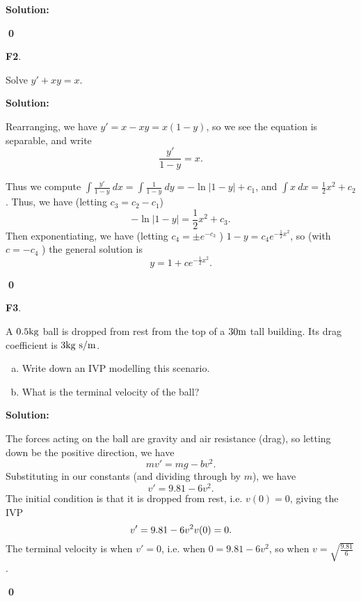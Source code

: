 \documentclass{article}
\newenvironment{problem}[1]
{
  \begin{flushleft}
  \textbf{#1}.
  \ignorespaces
}
{
  \end{flushleft}
}
\newenvironment{solution}
{
  \ignorespaces
  \textbf{Solution:}
}
{
  \ignorespacesafterend
  \begin{flushright}
  {\bfseries \qed}
  \end{flushright}
}
\begin{document}
\begin{solution}

\begin{center}\end{center}
\end{solution}


\begin{problem}{F2}
Solve \(y'+xy=x\).
\end{problem}
\begin{solution}
Rearranging, we have \(y'=x-xy=x(1-y)\), so we see the equation is separable, and write
\[ \frac{y'}{1-y} = x .\]

Thus we compute \(\int \frac{y'}{1-y}\ dx = \int \frac{1}{1-y}\ dy = -\ln|1-y|+c_1\), and \(\int x\ dx = \frac{1}{2}x^2+c_2\).  
Thus, we have (letting \(c_3=c_2-c_1\)) \[-\ln|1-y|=\frac{1}{2}x^2+c_3.\]
Then exponentiating, we have (letting \(c_4=\pm e^{-c_3}\) ) \(1-y=c_4e^{-\frac{1}{2}x^2}\), so (with \(c=-c_4\) ) the general solution is   \[y=1+c e^{-\frac{1}{2}x^2}.\]
\end{solution}

\begin{problem}{F3}
A \(0.5 {\rm kg}\) ball is dropped from rest from the top of a \(30 {\rm m}\) tall building.  Its drag coefficient is \(3 {\rm kg\ s/m}\).
\begin{enumerate}[(a)]
\item Write down an IVP modelling this scenario.
\item What is the terminal velocity of the ball?
\end{enumerate}
\end{problem}
\begin{solution}
The forces acting on the ball are gravity and air resistance (drag), so letting down be the positive direction, we have
\[mv'=mg-bv^2.\]
Substituting in our constants (and dividing through by \(m\)), we have
\[v'=9.81- 6v^2 .\]
The initial condition is that it is dropped from rest, i.e. \(v(0)=0\), giving the IVP 
\[v'=9.81- 6v^2 \vspace{5em} v(0)=0.\]
The terminal velocity is when \(v'=0\), i.e. when \(0=9.81-6v^2\), so when \(v= \sqrt{\frac{9.81}{6}}\).
\end{solution}
\end{document}
